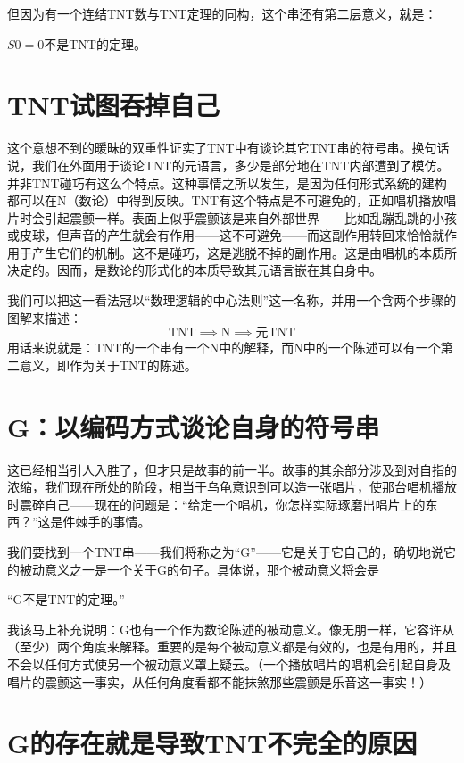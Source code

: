 但因为有一个连结TNT数与TNT定理的同构，这个串还有第二层意义，就是：

\begin{block}
$S0=0$不是TNT的定理。
\end{block}

\section{TNT试图吞掉自己}

这个意想不到的暖昧的双重性证实了TNT中有谈论其它TNT串的符号串。换句话说，我们在外面用于谈论TNT的元语言，多少是部分地在TNT内部遭到了模仿。并非TNT碰巧有这么个特点。这种事情之所以发生，是因为任何形式系统的建构都可以在N（数论）中得到反映。TNT有这个特点是不可避免的，正如唱机播放唱片时会引起震颤一样。表面上似乎震颤该是来自外部世界——比如乱蹦乱跳的小孩或皮球，但声音的产生就会有作用——这不可避免——而这副作用转回来恰恰就作用于产生它们的机制。这不是碰巧，这是逃脱不掉的副作用。这是由唱机的本质所决定的。因而，是数论的形式化的本质导致其元语言嵌在其自身中。

我们可以把这一看法冠以“数理逻辑的中心法则”这一名称，并用一个含两个步骤的图解来描述：
\[
\text{TNT}\implies \text{N} \implies \text{元TNT}
\]
用话来说就是：TNT的一个串有一个N中的解释，而N中的一个陈述可以有一个第二意义，即作为关于TNT的陈述。

\section{G：以编码方式谈论自身的符号串}

这已经相当引人入胜了，但才只是故事的前一半。故事的其余部分涉及到对自指的浓缩，我们现在所处的阶段，相当于乌龟意识到可以造一张唱片，使那台唱机播放时震碎自己——现在的问题是：“给定一个唱机，你怎样实际琢磨出唱片上的东西？”这是件棘手的事情。

我们要找到一个TNT串——我们将称之为“G”——它是关于它自己的，确切地说它的被动意义之一是一个关于G的句子。具体说，那个被动意义将会是

\begin{block}
“G不是TNT的定理。”
\end{block}
我该马上补充说明：G也有一个作为数论陈述的被动意义。像无朋一样，它容许从（至少）两个角度来解释。重要的是每个被动意义都是有效的，也是有用的，并且不会以任何方式使另一个被动意义罩上疑云。（一个播放唱片的唱机会引起自身及唱片的震颤这一事实，从任何角度看都不能抹煞那些震颤是乐音这一事实！）

\section{G的存在就是导致TNT不完全的原因}

